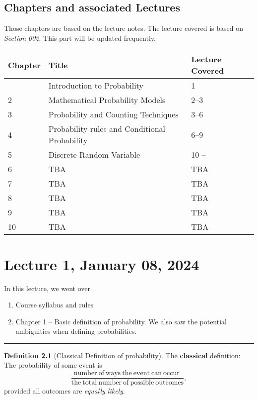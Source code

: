 \documentclass[
]{book}
\providecommand{\tightlist}{%
  \setlength{\itemsep}{0pt}\setlength{\parskip}{0pt}}
\theoremstyle{definition}
\newtheorem{definition}{Definition}[chapter]
\theoremstyle{definition}
\theoremstyle{definition}
\theoremstyle{definition}
\theoremstyle{remark}
\begin{document}
\hypertarget{chapters-and-associated-lectures}{%
\section{Chapters and associated Lectures}\label{chapters-and-associated-lectures}}

Those chapters are based on the lecture notes. The lecture covered is based on \emph{Section 002}. This part will be updated frequently.

\begin{longtable}[]{@{}lll@{}}
\toprule\noalign{}
Chapter & Title & Lecture Covered \\
\midrule\noalign{}
\endhead
\bottomrule\noalign{}
\endlastfoot
1 & Introduction to Probability & 1 \\
2 & Mathematical Probability Models & 2--3 \\
3 & Probability and Counting Techniques & 3--6 \\
4 & Probability rules and Conditional Probability & 6--9 \\
5 & Discrete Random Variable & 10 -- \\
6 & TBA & TBA \\
7 & TBA & TBA \\
8 & TBA & TBA \\
9 & TBA & TBA \\
10 & TBA & TBA \\
\end{longtable}

\hypertarget{lecture-1-january-08-2024}{%
\chapter{Lecture 1, January 08, 2024}\label{lecture-1-january-08-2024}}

In this lecture, we went over

\begin{enumerate}
\def\labelenumi{\arabic{enumi}.}
\tightlist
\item
  Course syllabus and rules
\item
  Chapter 1 -- Basic definition of probability. We also saw the potential ambiguities when defining probabilities.
\end{enumerate}

\begin{center}\rule{0.5\linewidth}{0.5pt}\end{center}

\begin{definition}[Classical Definition of probability]
The \textbf{classical} definition: The probability of some event is
\[
\frac{\mathrm{number~of~ways~the~event~can~occur~}}
{\mathrm{{the~total~number~of~possible~outcomes}}},
\]
provided all outcomes are \emph{equally likely}.
\end{definition}
\end{document}
